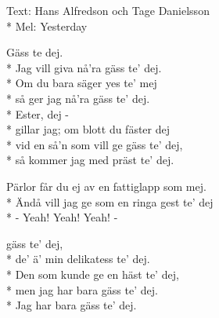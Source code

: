 \begin{SongText}
    \begin{SongInfo}
        Text: Hans Alfredson och Tage Danielsson\\*%
        Mel: Yesterday
    \end{SongInfo}
    \begin{SongVerse}
        Gäss te dej.\\*%
        Jag vill giva nå’ra gäss te’ dej.\\*%
        Om du bara säger yes te’ mej\\*%
        så ger jag nå’ra gäss te’ dej.\\*%
        Ester, dej -\\*%
        gillar jag; om blott du fäster dej\\*%
        vid en så’n som vill ge gäss te’ dej,\\*%
        så kommer jag med präst te’ dej.
    \end{SongVerse}
    \begin{SongVerse}
        Pärlor får du ej av en fattiglapp som mej.\\*%
        Ändå vill jag ge som en ringa gest te’ dej\\*%
        - Yeah! Yeah! Yeah! -
    \end{SongVerse}
    \begin{SongVerse}
        gäss te’ dej,\\*%
        de’ ä’ min delikatess te’ dej.\\*%
        Den som kunde ge en häst te’ dej,\\*%
        men jag har bara gäss te’ dej.\\*%
        Jag har bara gäss te’ dej.
    \end{SongVerse}
\end{SongText}
